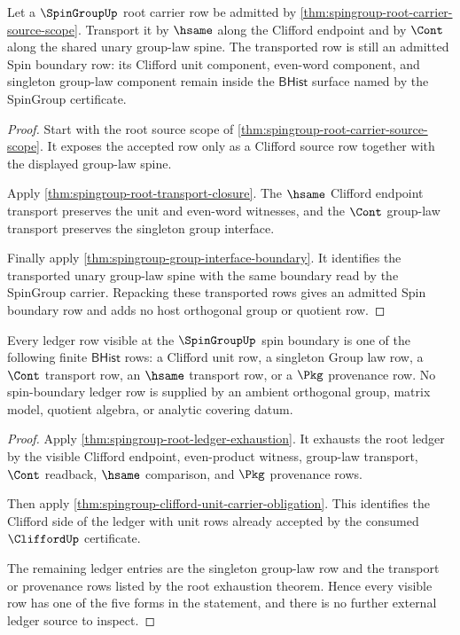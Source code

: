 \begin{theorem}
\label{thm:spingroup-spin-boundary-inclusion-transport}
Let a $\SpinGroupUp$ root carrier row be admitted by
\autoref{thm:spingroup-root-carrier-source-scope}. Transport it by $\hsame$
along the Clifford endpoint and by $\Cont$ along the shared unary group-law
spine. The transported row is still an admitted Spin boundary row: its Clifford
unit component, even-word component, and singleton group-law component remain
inside the $\mathsf{BHist}$ surface named by the SpinGroup certificate.
\end{theorem}
\begin{proof}
Start with the root source scope of
\autoref{thm:spingroup-root-carrier-source-scope}. It exposes the accepted row
only as a Clifford source row together with the displayed group-law spine.

Apply \autoref{thm:spingroup-root-transport-closure}. The $\hsame$ Clifford
endpoint transport preserves the unit and even-word witnesses, and the
$\Cont$ group-law transport preserves the singleton group interface.

Finally apply \autoref{thm:spingroup-group-interface-boundary}. It identifies
the transported unary group-law spine with the same boundary read by the
SpinGroup carrier. Repacking these transported rows gives an admitted Spin
boundary row and adds no host orthogonal group or quotient row.
\end{proof}

\begin{theorem}
\label{thm:spingroup-clifford-unit-ledger-coverage}
Every ledger row visible at the $\SpinGroupUp$ spin boundary is one of the
following finite $\mathsf{BHist}$ rows: a Clifford unit row, a singleton Group
law row, a $\Cont$ transport row, an $\hsame$ transport row, or a $\Pkg$
provenance row. No spin-boundary ledger row is supplied by an ambient
orthogonal group, matrix model, quotient algebra, or analytic covering datum.
\end{theorem}
\begin{proof}
Apply \autoref{thm:spingroup-root-ledger-exhaustion}. It exhausts the root
ledger by the visible Clifford endpoint, even-product witness, group-law
transport, $\Cont$ readback, $\hsame$ comparison, and $\Pkg$ provenance rows.

Then apply \autoref{thm:spingroup-clifford-unit-carrier-obligation}. This
identifies the Clifford side of the ledger with unit rows already accepted by
the consumed $\CliffordUp$ certificate.

The remaining ledger entries are the singleton group-law row and the transport
or provenance rows listed by the root exhaustion theorem. Hence every visible
row has one of the five forms in the statement, and there is no further
external ledger source to inspect.
\end{proof}

